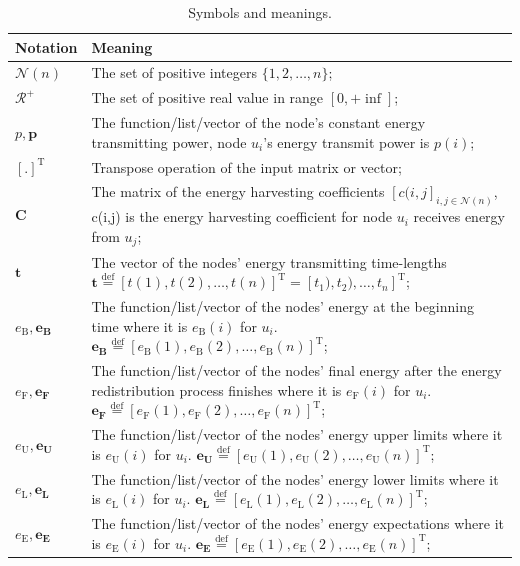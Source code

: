 \documentclass[journal,10pt]{IEEEtran}
\begin{document}
\begin{table}[!htbp]
\caption{Symbols and meanings.}
\centering
\label{T1}
\footnotesize{
\begin{tabular}
{|p{}|p{}|}
\hline
\hline
\textbf{Notation} & Meaning\\
\hline
\hline
$\mathcal{N}(n)$ & The set of positive integers $\{1,2,\ldots,n\}$;\\
\hline
$\mathcal{R^{+}}$ & The set of positive real value in range $[0,{+}\inf]$;\\
\hline
$p, \mathbf{p}$ & The function/list/vector of the node's constant energy transmitting power, node $u_i$'s energy transmit power is $p(i)$;\\
\hline
$[.]^{\text{T}}$ & Transpose operation of the input matrix or vector;\\
\hline
$\mathbf{C}$ & The matrix of the energy harvesting coefficients $[c(i,j]_{i,j{\in}\mathcal{N}(n)}$, c(i,j) is the energy harvesting coefficient for node $u_i$ receives energy from $u_j$;\\
\hline
$\mathbf{t}$ & The vector of the nodes' energy transmitting time-lengths $\mathbf{t}{\mathop{=}\limits^\text{def}}[t(1),t(2),\ldots,t(n)]^{\text{T}}{=}[t_1),t_2),\ldots,t_n]^{\text{T}}$;\\
\hline
$e_\text{B}, \mathbf{e_\text{B}}$ & The function/list/vector of the nodes' energy at the beginning time where it is $e_\text{B}(i)$ for $u_i$.  $\mathbf{e_\text{B}}{\mathop{=}\limits^\text{def}}[e_\text{B}(1),e_\text{B}(2),\ldots,e_\text{B}(n)]^{\text{T}}$;\\
\hline
$e_\text{F}, \mathbf{e_\text{F}}$ & The function/list/vector of the nodes' final energy after the energy redistribution process finishes where it is $e_\text{F}(i)$ for $u_i$. $\mathbf{e_\text{F}}{\mathop{=}\limits^\text{def}}[e_\text{F}(1),e_\text{F}(2),\ldots,e_\text{F}(n)]^{\text{T}}$;\\
\hline
$e_\text{U}, \mathbf{e_\text{U}}$ & The function/list/vector of the nodes' energy upper limits where it is $e_\text{U}(i)$ for $u_i$. $\mathbf{e_\text{U}}{\mathop{=}\limits^\text{def}}[e_\text{U}(1),e_\text{U}(2),\ldots,e_\text{U}(n)]^{\text{T}}$;\\
\hline
$e_\text{L}, \mathbf{e_\text{L}}$ & The function/list/vector of the nodes' energy lower limits where it is $e_\text{L}(i)$ for $u_i$. $\mathbf{e_\text{L}}{\mathop{=}\limits^\text{def}}[e_\text{L}(1),e_\text{L}(2),\ldots,e_\text{L}(n)]^{\text{T}}$;\\
\hline
$e_\text{E}, \mathbf{e_\text{E}}$ & The function/list/vector of the nodes' energy expectations where it is $e_\text{E}(i)$ for $u_i$. $\mathbf{e_\text{E}}{\mathop{=}\limits^\text{def}}[e_\text{E}(1),e_\text{E}(2),\ldots,e_\text{E}(n)]^{\text{T}}$;\\

\end{tabular}}
\end{table}
\end{document}
